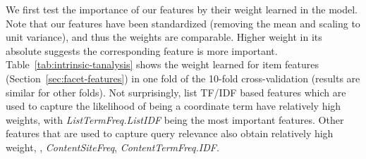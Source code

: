 We first test the importance of our features by their weight learned in the model. Note that our features have been standardized (removing the mean and scaling to unit variance), and thus the weights are comparable. Higher weight in its absolute suggests the corresponding feature is more important. Table~\ref{tab:intrinsic-tanalysis} shows the weight learned for item features (Section~\ref{sec:facet-features}) in one fold of the 10-fold cross-validation (results are similar for other folds). Not surprisingly, list TF/IDF based features which are used to capture the likelihood of being a coordinate term have relatively high weights, with \textit{ListTermFreq.ListIDF} being the most important features. Other features that are used to capture query relevance also obtain relatively high weight, \eg, \textit{ContentSiteFreq}, \textit{ContentTermFreq.IDF}. 
